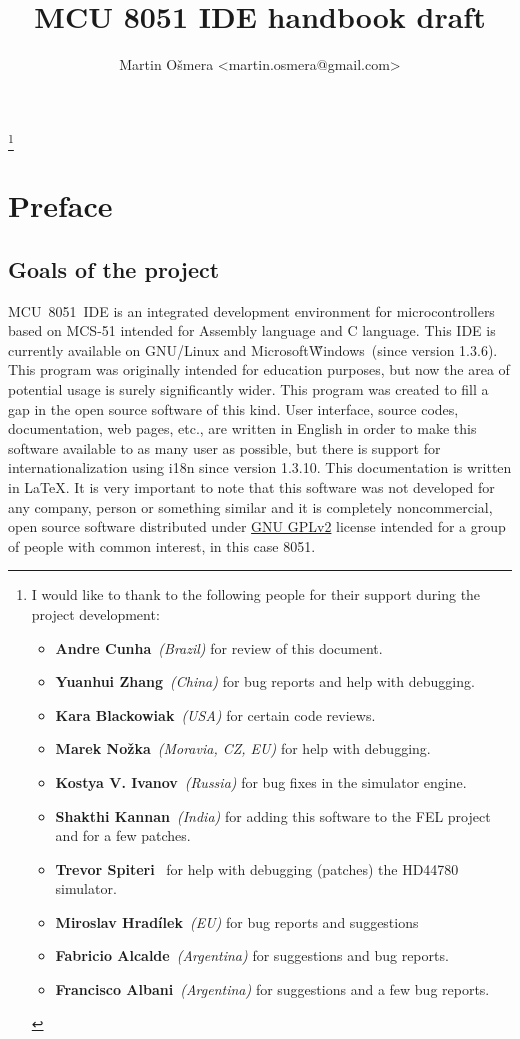\documentclass[a4paper,twoside,12pt]{book}
\title{MCU 8051 IDE handbook draft}
\author{Martin Ošmera <martin.osmera@gmail.com>}
\begin{document}
\maketitle
\thanks{
	I would like to thank to the following people for their support during the project development:

	\begin{itemize}
		\item \textbf{Andre Cunha}~\textit{(Brazil)} for review of this document.
		\item \textbf{Yuanhui Zhang}~\textit{(China)} for bug reports and help with debugging.
		\item \textbf{Kara Blackowiak}~\textit{(USA)} for certain code reviews.
		\item \textbf{Marek Nožka}~\textit{(Moravia, CZ, EU)} for help with debugging.
		\item \textbf{Kostya V. Ivanov}~\textit{(Russia)} for bug fixes in the simulator engine.
		\item \textbf{Shakthi Kannan}~\textit{(India)} for adding this software to the FEL project and for a few patches.
		\item \textbf{Trevor Spiteri}~ for help with debugging (patches) the HD44780 simulator.
		\item \textbf{Miroslav Hradílek}~\textit{(EU)} for bug reports and suggestions
		\item \textbf{Fabricio Alcalde}~\textit{(Argentina)} for suggestions and bug reports.
		\item \textbf{Francisco Albani}~\textit{(Argentina)} for suggestions and a few bug reports.
	\end{itemize}
}

\tableofcontents
\newpage

\chapter*{Preface}
	\section*{Goals of the project}
		MCU~8051~IDE is an integrated development environment for microcontrollers based on MCS-51 intended for Assembly language and C language. This IDE is currently available on GNU/Linux and Microsoft\textregistered\~Windows\textregistered\ (since version 1.3.6). This program was originally intended for education purposes, but now the area of potential usage is surely significantly wider. This program was created to fill a gap in the open source software of this kind. User interface, source codes, documentation, web pages, etc., are written in English in order to make this software available to as many user as possible, but there is support for internationalization using i18n since version 1.3.10. This documentation is written in \LaTeX. It is very important to note that this software was not developed for any company, person or something similar and it is completely noncommercial, open source software distributed under \href{http://gnu.cz/article/30/pdf/gpl-cz.pdf}{GNU GPLv2} license intended for a group of people with common interest, in this case 8051.
\end{document}
